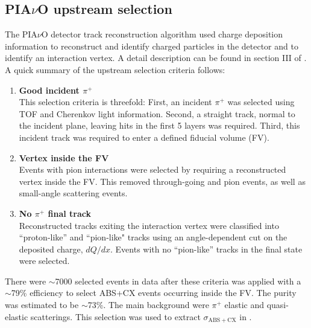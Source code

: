 \subsection{PIA$\nu$O upstream selection}
The PIA$\nu$O detector track reconstruction algorithm used charge deposition information to reconstruct and identify charged particles in the detector and to identify an interaction vertex. A detail description can be found in section III of \cite{duet}. A quick summary of the upstream selection criteria follows:
\begin{enumerate}
\item {\bf Good incident $\pi^{+}$\\}
This selection criteria is threefold: First, an incident $\pi^{+}$ was selected using TOF and Cherenkov light information. Second, a straight track, normal to the incident plane, leaving hits in the first 5 layers was required. Third, this incident track was required to enter a defined fiducial volume (FV).
\item {\bf Vertex inside the FV\\}
Events with pion interactions were selected by requiring a reconstructed vertex inside the FV. This removed through-going and pion events, as well as small-angle scattering events.
\item {\bf No $\pi^{+}$ final track\\}
Reconstructed tracks exiting the interaction vertex were classified into ``proton-like'' and ``pion-like" tracks using an angle-dependent cut on the deposited charge, $dQ/dx$. Events with no ``pion-like'' tracks in the final state were selected.
\end{enumerate}
There were $\sim$7000 selected events in data after these criteria was applied with a $\sim$79\% efficiency to select ABS+CX events occurring inside the FV. The purity was estimated to be $\sim$73\%. The main background were $\pi^{+}$ elastic and quasi-elastic scatterings. This selection was used to extract $\sigma{_\mathrm{ABS+CX}}$ in \cite{duet}.

